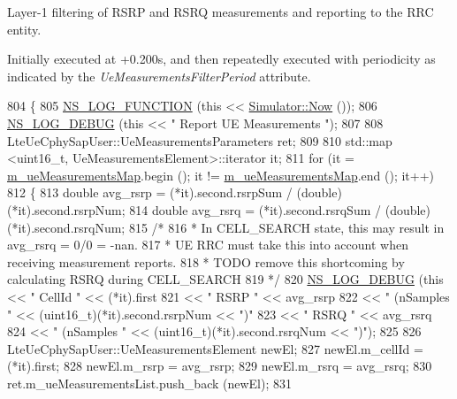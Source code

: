 Layer-\/1 filtering of R\+S\+RP and R\+S\+RQ measurements and reporting to the R\+RC entity. 

Initially executed at +0.200s, and then repeatedly executed with periodicity as indicated by the {\itshape Ue\+Measurements\+Filter\+Period} attribute. 
\begin{DoxyCode}
804 \{
805   \hyperlink{log-macros-disabled_8h_a90b90d5bad1f39cb1b64923ea94c0761}{NS\_LOG\_FUNCTION} (\textcolor{keyword}{this} << \hyperlink{classns3_1_1Simulator_ac3178fa975b419f7875e7105be122800}{Simulator::Now} ());
806   \hyperlink{group__logging_ga413f1886406d49f59a6a0a89b77b4d0a}{NS\_LOG\_DEBUG} (\textcolor{keyword}{this} << \textcolor{stringliteral}{" Report UE Measurements "});
807 
808   LteUeCphySapUser::UeMeasurementsParameters ret;
809 
810   std::map <uint16\_t, UeMeasurementsElement>::iterator it;
811   \textcolor{keywordflow}{for} (it = \hyperlink{classns3_1_1LteUePhy_a3d064f4bdc58614aa1e12c44a8ec111b}{m\_ueMeasurementsMap}.begin (); it != 
      \hyperlink{classns3_1_1LteUePhy_a3d064f4bdc58614aa1e12c44a8ec111b}{m\_ueMeasurementsMap}.end (); it++)
812     \{
813       \textcolor{keywordtype}{double} avg\_rsrp = (*it).second.rsrpSum / (double)(*it).second.rsrpNum;
814       \textcolor{keywordtype}{double} avg\_rsrq = (*it).second.rsrqSum / (\textcolor{keywordtype}{double})(*it).second.rsrqNum;
815       \textcolor{comment}{/*}
816 \textcolor{comment}{       * In CELL\_SEARCH state, this may result in avg\_rsrq = 0/0 = -nan.}
817 \textcolor{comment}{       * UE RRC must take this into account when receiving measurement reports.}
818 \textcolor{comment}{       * TODO remove this shortcoming by calculating RSRQ during CELL\_SEARCH}
819 \textcolor{comment}{       */}
820       \hyperlink{group__logging_ga413f1886406d49f59a6a0a89b77b4d0a}{NS\_LOG\_DEBUG} (\textcolor{keyword}{this} << \textcolor{stringliteral}{" CellId "} << (*it).first
821                          << \textcolor{stringliteral}{" RSRP "} << avg\_rsrp
822                          << \textcolor{stringliteral}{" (nSamples "} << (uint16\_t)(*it).second.rsrpNum << \textcolor{stringliteral}{")"}
823                          << \textcolor{stringliteral}{" RSRQ "} << avg\_rsrq
824                          << \textcolor{stringliteral}{" (nSamples "} << (uint16\_t)(*it).second.rsrqNum << \textcolor{stringliteral}{")"});
825 
826       LteUeCphySapUser::UeMeasurementsElement newEl;
827       newEl.m\_cellId = (*it).first;
828       newEl.m\_rsrp = avg\_rsrp;
829       newEl.m\_rsrq = avg\_rsrq;
830       ret.m\_ueMeasurementsList.push\_back (newEl);
831 

\end{DoxyCode}
